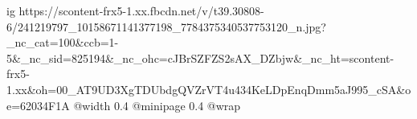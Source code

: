  
 
 
 
 

\ifcmt
  ig https://scontent-frx5-1.xx.fbcdn.net/v/t39.30808-6/241219797_10158671141377198_7784375340537753120_n.jpg?_nc_cat=100&ccb=1-5&_nc_sid=825194&_nc_ohc=cJBrSZFZS2sAX_DZbjw&_nc_ht=scontent-frx5-1.xx&oh=00_AT9UD3XgTDUbdgQVZrVT4u434KeLDpEnqDmm5aJ995_cSA&oe=62034F1A
  @width 0.4
  @minipage 0.4
  @wrap \parpic[r]
\fi
